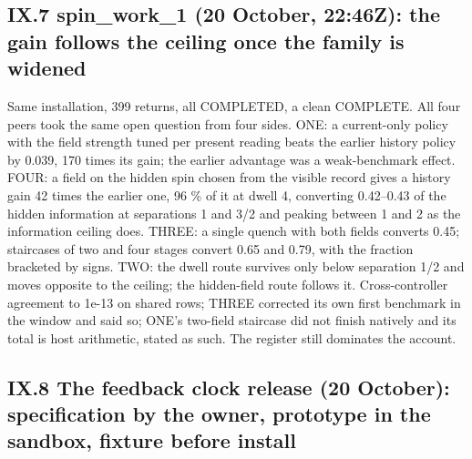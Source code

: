 \subsection{IX.7 spin\_work\_1 (20 October, 22:46Z): the gain follows the ceiling once the family is widened}\label{ix.7-spin_work_1-20-october-2246z-the-gain-follows-the-ceiling-once-the-family-is-widened}

Same installation, 399 returns, all COMPLETED, a clean COMPLETE. All four peers took the same open question from four sides. ONE: a current-only
policy with the field strength tuned per present reading beats the earlier history policy by 0.039, 170 times its gain; the earlier advantage
was a weak-benchmark effect. FOUR: a field on the hidden spin chosen from the visible record gives a history gain 42 times the earlier one, 96 \%
of it at dwell 4, converting 0.42--0.43 of the hidden information at separations 1 and 3/2 and peaking between 1 and 2 as the information
ceiling does. THREE: a single quench with both fields converts 0.45; staircases of two and four stages convert 0.65 and 0.79, with the fraction
bracketed by signs. TWO: the dwell route survives only below separation 1/2 and moves opposite to the ceiling; the hidden-field route follows
it. Cross-controller agreement to 1e-13 on shared rows; THREE corrected its own first benchmark in the window and said so; ONE's two-field
staircase did not finish natively and its total is host arithmetic, stated as such. The register still dominates the account.

\subsection{IX.8 The feedback clock release (20 October): specification by the owner, prototype in the sandbox, fixture before install}\label{ix.8-the-feedback-clock-release-20-october-specification-by-the-owner-prototype-in-the-sandbox-fixture-before-install}

